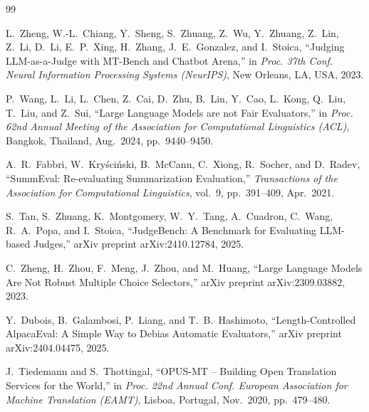 \documentclass[10pt,conference]{IEEEtran}
\begin{document}
\begin{thebibliography}{99}

L.~Zheng, W.-L.~Chiang, Y.~Sheng, S.~Zhuang, Z.~Wu, Y.~Zhuang, Z.~Lin, Z.~Li, D.~Li, E.~P.~Xing, H.~Zhang, J.~E.~Gonzalez, and I.~Stoica, ``Judging LLM-as-a-Judge with MT-Bench and Chatbot Arena,'' in \emph{Proc. 37th Conf. Neural Information Processing Systems (NeurIPS)}, New Orleans, LA, USA, 2023.

P.~Wang, L.~Li, L.~Chen, Z.~Cai, D.~Zhu, B.~Lin, Y.~Cao, L.~Kong, Q.~Liu, T.~Liu, and Z.~Sui, ``Large Language Models are not Fair Evaluators,'' in \emph{Proc. 62nd Annual Meeting of the Association for Computational Linguistics (ACL)}, Bangkok, Thailand, Aug.\ 2024, pp.~9440--9450.

A.~R.~Fabbri, W.~Kry\'sci\'nski, B.~McCann, C.~Xiong, R.~Socher, and D.~Radev, ``SummEval: Re-evaluating Summarization Evaluation,'' \emph{Transactions of the Association for Computational Linguistics}, vol.~9, pp.~391--409, Apr.\ 2021.

S.~Tan, S.~Zhuang, K.~Montgomery, W.~Y.~Tang, A.~Cuadron, C.~Wang, R.~A.~Popa, and I.~Stoica, ``JudgeBench: A Benchmark for Evaluating LLM-based Judges,'' arXiv preprint arXiv:2410.12784, 2025.

C.~Zheng, H.~Zhou, F.~Meng, J.~Zhou, and M.~Huang, ``Large Language Models Are Not Robust Multiple Choice Selectors,'' arXiv preprint arXiv:2309.03882, 2023.

Y.~Dubois, B.~Galambosi, P.~Liang, and T.~B.~Hashimoto, ``Length-Controlled AlpacaEval: A Simple Way to Debias Automatic Evaluators,'' arXiv preprint arXiv:2404.04475, 2025.

J.~Tiedemann and S.~Thottingal, ``OPUS-MT -- Building Open Translation Services for the World,'' in \emph{Proc. 22nd Annual Conf. European Association for Machine Translation (EAMT)}, Lisboa, Portugal, Nov.\ 2020, pp.~479--480.

\end{thebibliography}
\end{document}
